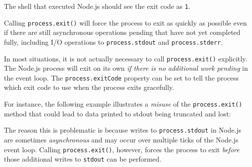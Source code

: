 The shell that executed Node.js should see the exit code as \texttt{1}.

Calling \texttt{process.exit()} will force the process to exit as
quickly as possible even if there are still asynchronous operations
pending that have not yet completed fully, including I/O operations to
\texttt{process.stdout} and \texttt{process.stderr}.

In most situations, it is not actually necessary to call
\texttt{process.exit()} explicitly. The Node.js process will exit on its
own \emph{if there is no additional work pending} in the event loop. The
\texttt{process.exitCode} property can be set to tell the process which
exit code to use when the process exits gracefully.

For instance, the following example illustrates a \emph{misuse} of the
\texttt{process.exit()} method that could lead to data printed to stdout
being truncated and lost:

\begin{Shaded}
\begin{Highlighting}[]
 \OperatorTok{;}

\NormalTok{ (}\NormalTok{()) \{}
  \NormalTok{()}\OperatorTok{;}
  \NormalTok{(}\NormalTok{)}\OperatorTok{;}
\NormalTok{\}}
\end{Highlighting}
\end{Shaded}

\begin{Shaded}
\begin{Highlighting}[]
\OperatorTok{=} \NormalTok{(}\NormalTok{)}\OperatorTok{;}

\NormalTok{ (}\NormalTok{()) \{}
  \NormalTok{()}\OperatorTok{;}
  \NormalTok{(}\NormalTok{)}\OperatorTok{;}
\NormalTok{\}}
\end{Highlighting}
\end{Shaded}

The reason this is problematic is because writes to
\texttt{process.stdout} in Node.js are sometimes \emph{asynchronous} and
may occur over multiple ticks of the Node.js event loop. Calling
\texttt{process.exit()}, however, forces the process to exit
\emph{before} those additional writes to \texttt{stdout} can be
performed.

